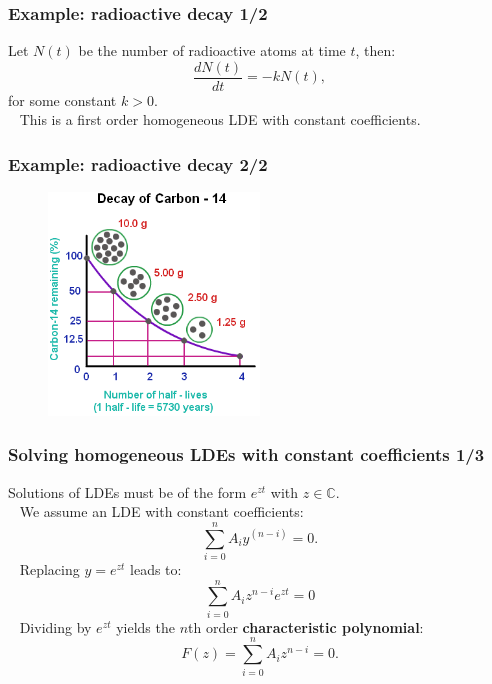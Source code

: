 \documentclass{beamer}
\begin{document}
\begin{frame}
\frametitle{Example: radioactive decay 1/2}
Let $N(t)$ be the number of radioactive atoms at time $t$, then:
\begin{equation*}
\frac{dN(t)}{dt} = - k N(t),
\end{equation*}
for some constant $k>0$. \\ \pause
\ \newline
This is a first order homogeneous LDE with constant coefficients.
\end{frame}

\begin{frame}
\frametitle{Example: radioactive decay 2/2}
\begin{figure}
\includegraphics[width=0.5\textwidth]{decay-of-carbon-14.png}
\end{figure}
\end{frame}

\begin{frame}
\frametitle{Solving homogeneous LDEs with constant coefficients 1/3}
Solutions of LDEs must be of the form $e^{zt}$ with $z \in \mathbb{C}$. \\
\pause
\ \newline
We assume an LDE with constant coefficients:
\begin{equation*}
\sum_{i=0}^n A_i y^{(n-i)} = 0.
\end{equation*}
\ \pause
Replacing $y = e^{zt}$ leads to:
\begin{equation*}
\sum_{i=0}^n A_i z^{n-i} e^{zt} = 0
\end{equation*}
\ \pause
Dividing by $e^{zt}$ yields the $n$th order \textbf{characteristic polynomial}:
\begin{equation*}
F(z) = \sum_{i=0}^n A_i z^{n-i} = 0.
\end{equation*}
\end{frame}
\end{document}

